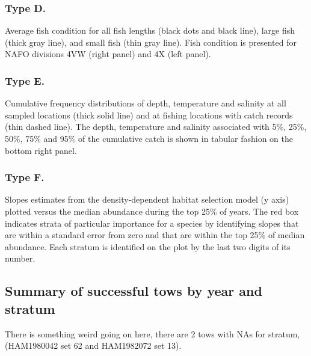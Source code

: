 \documentclass[12pt]{article}\usepackage[]{graphicx}\usepackage[]{color}
\begin{document}
\hypertarget{type-d.}{%
\subsubsection{Type D.}\label{type-d.}}

Average fish condition for all fish lengths (black dots and black line), large fish (thick gray line), and small fish (thin gray line). Fish condition is presented for NAFO divisions 4VW (right panel) and 4X (left panel).

\hypertarget{type-e.}{%
\subsubsection{Type E.}\label{type-e.}}

Cumulative frequency distributions of depth, temperature and salinity at all sampled locations (thick solid line) and at fishing locations with catch records (thin dashed line). The depth, temperature and salinity associated with 5\%, 25\%, 50\%, 75\% and 95\% of the cumulative catch is shown in tabular fashion on the bottom right panel.

\hypertarget{type-f.}{%
\subsubsection{Type F.}\label{type-f.}}

Slopes estimates from the density-dependent habitat selection model (y axis) plotted versus the median abundance during the top 25\% of years. The red box indicates strata of particular importance for a species by identifying slopes that are within a standard error from zero and that are within the top 25\% of median abundance. Each stratum is identified on the plot by the last two digits of its number.

\hypertarget{summary-of-successful-tows-by-year-and-stratum}{%
\subsection{Summary of successful tows by year and stratum}\label{summary-of-successful-tows-by-year-and-stratum}}

There is something weird going on here, there are 2 tows with NAs for stratum, (HAM1980042 set 62 and HAM1982072 set 13).
\end{document}
